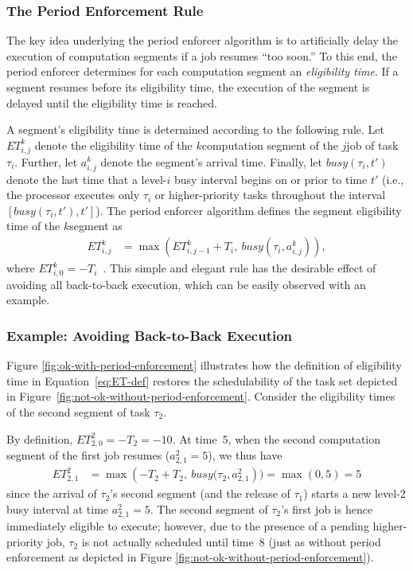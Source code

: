 \subsubsection{The Period Enforcement Rule}

The key idea underlying the period enforcer algorithm is to artificially delay the execution of computation segments if a job resumes ``too soon.'' To this end,  the period enforcer determines for each computation segment an \emph{eligibility time}. If a segment resumes  before its eligibility time, the execution of the segment is delayed until the eligibility time is reached.

A segment's eligibility time is determined according to the following rule. Let $ET_{i,j}^k$ denote the eligibility time of the $k$\xth computation segment of the $j$\xth job of task $\tau_i$. Further, let $a^k_{i,j}$ denote the segment's arrival time. Finally, let $\mathit{busy}(\tau_i, t')$ denote the last time that a level-$i$ busy interval begins on or prior to time $t'$ (i.e., the processor executes only $\tau_i$ or higher-priority tasks throughout the interval $[\mathit{busy}(\tau_i, t'), t']$). The period enforcer algorithm defines the segment eligibility time of the $k$\xth segment as
\begin{align}\label{eq:ET-def}
	ET_{i,j}^k & = \max\left(ET_{i,j-1}^k + T_i,\ \mathit{busy}(\tau_i, a^k_{i,j})\right),
\end{align}
where $ET_{i,0}^k = -T_i$~\cite[Section 3.1]{Raj:suspension1991}. This simple and elegant rule has the desirable effect of avoiding all back-to-back execution, which can be easily observed with an example.

\subsubsection{Example: Avoiding Back-to-Back Execution}

Figure \ref{fig:ok-with-period-enforcement} illustrates how the definition of eligibility time in Equation~\eqref{eq:ET-def} restores the schedulability of the task set depicted in Figure~\ref{fig:not-ok-without-period-enforcement}. Consider the eligibility times of the second segment of task $\tau_2$.

By definition,  $ET_{2,0}^2 = -T_2 = -10$. At time~5, when the second computation segment of the first job resumes ($a_{2,1}^2 = 5$), we thus have
\begin{align*}
	ET_{2,1}^2 & = \max\left(-T_2 + T_2,\ \mathit{busy}(\tau_2, a_{2,1}^2\right) ) = \max(0, 5) = 5
\end{align*}
since the arrival of $\tau_2$'s second segment (and the release of $\tau_1$) starts a new level-2 busy interval at time $a_{2,1}^2 = 5$. The second segment of $\tau_2$'s first job is hence immediately eligible to execute; however, due to the presence of a pending higher-priority job, $\tau_2$ is not actually scheduled until time~8 (just as without period enforcement as depicted in Figure \ref{fig:not-ok-without-period-enforcement}).

